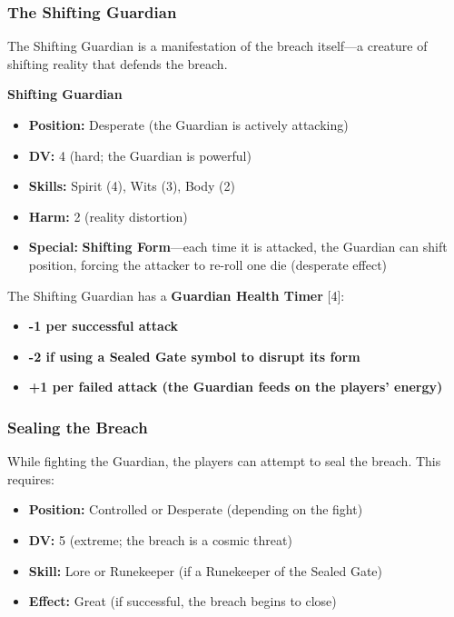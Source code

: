 \documentclass{article}
\begin{document}
\subsubsection{The Shifting Guardian}

The Shifting Guardian is a manifestation of the breach itself---a creature of shifting reality that defends the breach.

\begin{center}
\textbf{Shifting Guardian}
\end{center}

\begin{itemize}
    \item \textbf{Position:} Desperate (the Guardian is actively attacking)
    \item \textbf{DV:} 4 (hard; the Guardian is powerful)
    \item \textbf{Skills:} Spirit (4), Wits (3), Body (2)
    \item \textbf{Harm:} 2 (reality distortion)
    \item \textbf{Special:} \textbf{Shifting Form}---each time it is attacked, the Guardian can shift position, forcing the attacker to re-roll one die (desperate effect)
\end{itemize}

The Shifting Guardian has a \textbf{Guardian Health Timer } [4]:

\begin{itemize}
    \item \textbf{-1 per successful attack}
    \item \textbf{-2 if using a Sealed Gate symbol to disrupt its form}
    \item \textbf{+1 per failed attack (the Guardian feeds on the players' energy)}
\end{itemize}

\subsubsection{Sealing the Breach}

While fighting the Guardian, the players can attempt to seal the breach. This requires:

\begin{itemize}
    \item \textbf{Position:} Controlled or Desperate (depending on the fight)
    \item \textbf{DV:} 5 (extreme; the breach is a cosmic threat)
    \item \textbf{Skill:} Lore or Runekeeper (if a Runekeeper of the Sealed Gate)
    \item \textbf{Effect:} Great (if successful, the breach begins to close)
\end{itemize}
\end{document}
